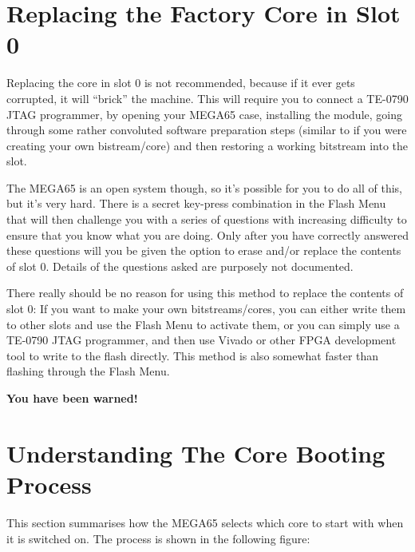 \section{Replacing the Factory Core in Slot 0}

Replacing the core in slot 0 is not recommended, because if it ever gets corrupted, it will ``brick'' the machine.
This will require you to connect a TE-0790 JTAG programmer, by opening your MEGA65 case, installing
the module, going through some rather convoluted software preparation steps (similar to if you were
creating your own bistream/core) and then restoring a working bitstream into the slot.

The MEGA65 is an open system though, so it's possible for you to do all of this, but it's very hard. There
is a secret key-press combination in the Flash Menu that will then challenge you with a series of questions with
increasing difficulty to ensure that you know what you are doing. Only after you have correctly
answered these questions will you be given the option to erase and/or replace the contents of slot 0.
Details of the questions asked are purposely not documented.

There really should be no reason for using this method to replace the contents of slot 0:
If you want to make your own bitstreams/cores, you can either write them to other slots and use the
Flash Menu to activate them, or you can simply use a TE-0790 JTAG programmer, and then use
Vivado or other FPGA development tool to write to the flash directly. This method is also
somewhat faster than flashing through the Flash Menu.

{\bf You have been warned!}

\section{Understanding The Core Booting Process}

This section summarises how the MEGA65 selects which core to start with when it is switched on.
The process is shown in the following figure:


